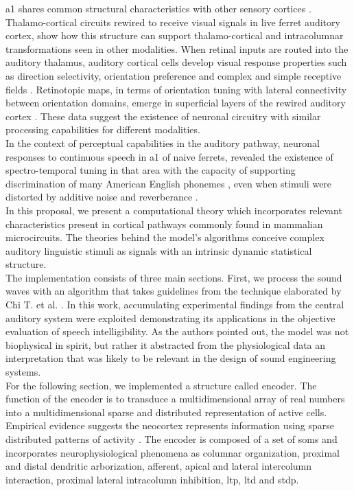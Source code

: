 \documentclass[11pt,a4paper]{article}
\begin{document}
\gls{a1} shares common structural
characteristics with other sensory cortices
\cite{huang_2000, winer_1992, rockel_1980, mitani_1985, mitani_1985A}.
Thalamo-cortical circuits rewired to receive
visual signals in live ferret auditory cortex,
show how this structure can support
thalamo-cortical and intracolumnar transformations
seen in other modalities.
When retinal inputs are routed into the auditory thalamus,
auditory cortical cells develop visual response properties
such as direction selectivity,
orientation preference and
complex and simple receptive fields
\cite{sur_1988, angelucci_1998, roe_1992}.
Retinotopic maps, in terms of orientation tuning with lateral connectivity between
orientation domains, emerge in superficial layers of the rewired
auditory cortex \cite{roe_1990, sur_2000}.
These data suggest the existence of neuronal circuitry
with similar processing capabilities for different modalities.\\

In the context of perceptual capabilities in 
the auditory pathway,
neuronal responses to continuous speech in
\gls{a1} of naive ferrets,
revealed the existence of spectro-temporal tuning
in that area with the capacity of supporting discrimination
of many American English phonemes \cite{mesgarani_2008},
even when stimuli were distorted by additive noise and
reverberance \cite{mesgarani_2014A}.\\

In this proposal, we present a computational
theory which incorporates relevant
characteristics present in cortical pathways commonly found in mammalian
microcircuits. The theories behind the model’s algorithms conceive complex
auditory linguistic stimuli as signals with an intrinsic dynamic statistical
structure. \\

The implementation consists of three main sections.
First, we process the sound waves with an algorithm
that takes guidelines from
the technique elaborated by Chi T. et al. \cite{chi_2005}.
In this work, accumulating experimental findings
from the central auditory system
were exploited demonstrating its applications in the objective
evaluation of speech intelligibility.
As the authors pointed out, the model was not biophysical in spirit,
but rather it abstracted from the physiological data an interpretation
that was likely to be relevant in the design of sound engineering systems. \\

For the following section, we implemented a structure called encoder.
The function of the encoder is to transduce a multidimensional
array of real numbers into a multidimensional sparse and distributed representation of
active cells. Empirical evidence suggests the neocortex represents 
information using sparse distributed patterns of activity \cite{barth_2012}.
The encoder is composed of a set of \glspl{som} \cite{kohonen_2082, Kohonen:1989:SAM:69371}
and incorporates neurophysiological phenomena as columnar organization, proximal and distal
dendritic arborization, afferent, apical and lateral intercolumn interaction, proximal
lateral intracolumn inhibition, \gls{ltp}, \gls{ltd} and \gls{stdp}. \\
\end{document}
